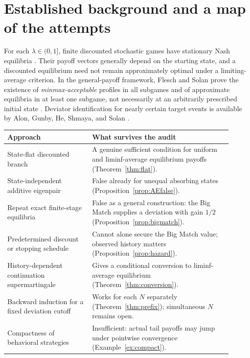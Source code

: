 \documentclass[11pt,a4paper]{article}
\numberwithin{equation}{section}
\theoremstyle{definition}
\theoremstyle{remark}
\begin{document}
\section{Established background and a map of the attempts}
For each $\lambda\in(0,1]$, finite discounted stochastic games have stationary
Nash equilibria \cite{fink1964}. Their payoff vectors generally depend on the
starting state, and a discounted equilibrium need not remain approximately
optimal under a limiting-average criterion. In the general-payoff framework,
Flesch and Solan prove the existence of \emph{minmax-acceptable} profiles in
all subgames and of approximate equilibria in at least one subgame, not
necessarily at an arbitrarily prescribed initial state \cite{fleschsolan2023}.
Deviator identification for nearly certain target events is available by
Alon, Gunby, He, Shmaya, and Solan \cite{alon2024}.

\begin{center}
\renewcommand{\arraystretch}{1.18}
\begin{tabular}{@{}p{0.34\linewidth}p{0.57\linewidth}@{}}
\toprule
\textbf{Approach} & \textbf{What survives the audit}\\
\midrule
State-flat discounted branch & A genuine sufficient condition for uniform and liminf-average equilibrium payoffs (Theorem~\ref{thm:flat}).\\
State-independent additive eigenpair & False already for unequal absorbing states (Proposition~\ref{prop:AEfalse}).\\
Repeat exact finite-stage equilibria & False as a general construction: the Big Match supplies a deviation with gain $1/2$ (Proposition~\ref{prop:bigmatch}).\\
Predetermined discount or stopping schedule & Cannot alone secure the Big Match value; observed history matters (Proposition~\ref{prop:hazard}).\\
History-dependent continuation supermartingale & Gives a conditional conversion to liminf-average equilibrium (Theorem~\ref{thm:conversion}).\\
Backward induction for a fixed deviation cutoff & Works for each $N$ separately (Theorem~\ref{thm:prefix}); simultaneous $N$ remains open.\\
Compactness of behavioral strategies & Insufficient: actual tail payoffs may jump under pointwise convergence (Example~\ref{ex:compact}).\\
\bottomrule
\end{tabular}
\end{center}
\end{document}
